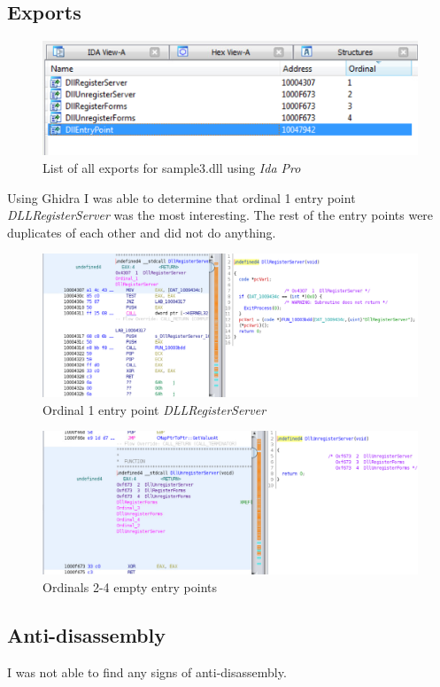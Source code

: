 \documentclass{article}
\begin{document}
    \subsection{Exports}
    \begin{figure}[H]
        \includegraphics[width=\textwidth]{dllentrypoints.png}
        \caption{List of all exports for sample3.dll using \textit{Ida Pro}}
    \end{figure}
    Using Ghidra I was able to determine that ordinal 1 entry point \textit{DLLRegisterServer} was the most interesting. The rest of the entry points were duplicates of each other and did not do anything.
    \begin{figure}[H]
        \includegraphics[width=\textwidth]{export1.png}
        \caption{Ordinal 1 entry point \textit{DLLRegisterServer}}
    \end{figure}
    \begin{figure}[H]
        \includegraphics[width=\textwidth]{exports2-4.png}
        \caption{Ordinals 2-4 empty entry points}
    \end{figure}
    \subsection{Anti-disassembly}
    I was not able to find any signs of anti-disassembly.
\end{document}
